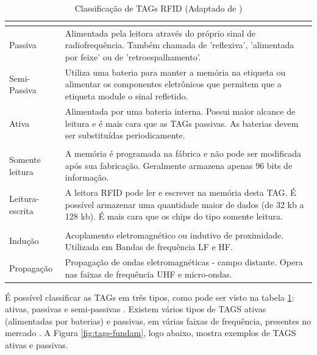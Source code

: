  
\begin{table}[H]
\centering
\caption{Classificação de TAGs RFID (Adaptado de \cite{AhmedIntegrationStreamMapping})}
\label{tab:comparativoTags}
\begin{tabular}{p{3cm}p{9cm}}
\hline
\multicolumn{2}{c}{\cellcolor{lightgray}{Origem da alimentação elétrica}} \\ \hline
Passiva         &   Alimentada pela leitora através do próprio sinal de radiofrequência. Também chamada de 'reflexiva', 'alimentada por feixe' ou de 'retroespalhamento'.     \\ \hline
Semi-Passiva    &   Utiliza uma bateria para manter a memória na etiqueta ou alimentar os componentes eletrônicos que permitem que a etiqueta module o sinal refletido.    \\ \hline
Ativa           &   Alimentada por uma bateria interna. Possui maior alcance de leitura e é mais cara que as TAGs passivas. As baterias devem ser substituídas periodicamente.    \\ \hline
\multicolumn{2}{c}{\cellcolor{lightgray}{Tipo de Memória}} \\ \hline
Somente leitura       &   A memória é programada na fábrica e não pode ser modificada após sua fabricação. Geralmente armazena apenas 96 bits de informação.       \\ \hline
Leitura-escrita    &   A leitora RFID pode ler e escrever na memória desta TAG. É possível armazenar uma quantidade maior de dados (de 32 kb a 128 kb). É mais cara que os chips do tipo somente leitura.   \\ \hline
\multicolumn{2}{c}{\cellcolor{lightgray}{Tipo de Comunicação entre a TAG e a Leitora}} \\ \hline
Indução       &   Acoplamento eletromagnético ou indutivo de proximidade. Utilizada em Bandas de frequência LF e HF.       \\ \hline
Propagação    &   Propagação de ondas eletromagnéticas - campo distante. Opera nas faixas de frequência UHF e micro-ondas.   \\ \hline
\end{tabular}
\end{table}



É possível classificar as TAGs em três tipos, como pode ser visto na tabela \ref{tab:comparativoTags}: ativas, passivas e semi-passivas \cite{chawla2007overview}.  Existem vários tipos de TAGS ativas (alimentadas por baterias) e passivas, em várias faixas de frequência, presentes no mercado \cite{rao1999overview}. A Figura \ref{fig:tags-fundam}, logo abaixo, mostra exemplos de TAGS ativas e passivas.



